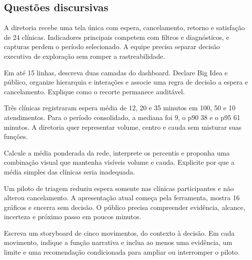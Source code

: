 \subsection{Questões discursivas}


\TextoBase

A diretoria recebe uma tela única com espera, cancelamento, retorno e satisfação de 24 clínicas. Indicadores principais competem com filtros e diagnósticos, e capturas perdem o período selecionado. A equipe precisa separar decisão executiva de exploração sem romper a rastreabilidade.

\FonteDidatica

\Comando Em até 15 linhas, descreva duas camadas do dashboard. Declare Big Idea e público, organize hierarquia e interações e associe uma regra de decisão a espera e cancelamento. Explique como o recorte permanece auditável.


\TextoBase

Três clínicas registraram espera média de 12, 20 e 35 minutos em 100, 50 e 10 atendimentos. Para o período consolidado, a mediana foi 9, o p90 38 e o p95 61 minutos. A diretoria quer representar volume, centro e cauda sem misturar suas funções.

\FonteDidatica

\Comando Calcule a média ponderada da rede, interprete os percentis e proponha uma combinação visual que mantenha visíveis volume e cauda. Explicite por que a média simples das clínicas seria inadequada.


\TextoBase

Um piloto de triagem reduziu espera somente nas clínicas participantes e não alterou cancelamento. A apresentação atual começa pela ferramenta, mostra 16 gráficos e encerra sem decisão. O público precisa compreender evidência, alcance, incerteza e próximo passo em poucos minutos.

\FonteDidatica

\Comando Escreva um storyboard de cinco movimentos, do contexto à decisão. Em cada movimento, indique a função narrativa e inclua ao menos uma evidência, um limite e uma recomendação condicionada para ampliar ou interromper o piloto.

